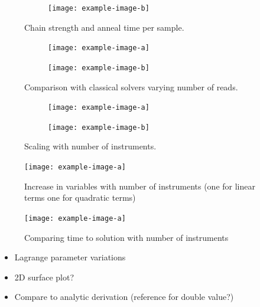 \documentclass[12pt]{article}
\theoremstyle{definition}
\begin{document}
\begin{figure}
    \begin{subfigure}{0.5\textwidth}
        
        \caption{}
    \end{subfigure}\hfill
    \begin{subfigure}{0.5\textwidth}
        \texttt{[image: example-image-b]}
        \caption{}
    \end{subfigure}
    \caption{Chain strength and anneal time per sample.}
    \label{fig:solver-config}
\end{figure}

\begin{figure}
    \begin{subfigure}{0.5\textwidth}
        \texttt{[image: example-image-a]}
        \caption{}
    \end{subfigure}\hfill
    \begin{subfigure}{0.5\textwidth}
        \texttt{[image: example-image-b]}
        \caption{}
    \end{subfigure}
    \caption{Comparison with classical solvers varying number of reads.}
    \label{fig:reads}
\end{figure}

\begin{figure}
    \begin{subfigure}{0.5\textwidth}
        \texttt{[image: example-image-a]}
        \caption{}
    \end{subfigure}\hfill
    \begin{subfigure}{0.5\textwidth}
        \texttt{[image: example-image-b]}
        \caption{}
    \end{subfigure}
    \caption{Scaling with number of instruments.}
    \label{fig:energy-scaling}
\end{figure}

\begin{figure}
    \texttt{[image: example-image-a]}
    \caption{Increase in variables with number of instruments (one for linear terms one for quadratic terms)}
    \label{fig:qubit-scaling}
\end{figure}

\begin{figure}
    \texttt{[image: example-image-a]}
    \caption{Comparing time to solution with number of instruments}
    \label{fig:times}
\end{figure}

\begin{itemize}
    \item Lagrange parameter variations
    \item 2D surface plot?
    \item Compare to analytic derivation (reference for double value?)
\end{itemize}
\end{document}
